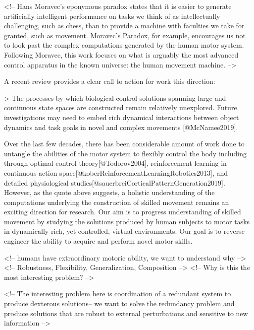 \documentclass[../main.tex]{subfiles}
\begin{document}
<!-- Hans Moravec's eponymous paradox states that it is easier to generate artificially intelligent performance on tasks we think of as intellectually challenging, such as chess, than to provide a machine with faculties we take for granted, such as movement. Moravec's Paradox, for example, encourages us not to look past the complex computations generated by the human motor system. Following Moravec, this work focuses on what is arguably the most advanced control apparatus in the known universe: the human movement machine. -->


A recent review provides a clear call to action for work this direction:

> The processes by which biological control solutions spanning large and continuous state spaces are constructed remain relatively unexplored. Future investigations may need to embed rich dynamical interactions between object dynamics and task goals in novel and complex movements [@McNamee2019].

Over the last few decades, there has been considerable amount of work done to untangle the abilities of the motor system to flexibly control the body including through optimal control theory[@Todorov2004], reinforcement learning in continuous action space[@koberReinforcementLearningRobotics2013], and detailed physiological studies[@sauerbreiCorticalPatternGeneration2019]. However, as the quote above suggests, a holistic understanding of the computations underlying the construction of skilled movement remains an exciting direction for research. Our aim is to progress understanding of skilled movement by studying the solutions produced by human subjects to motor tasks in dynamically rich, yet controlled, virtual environments. Our goal is to reverse-engineer the ability to acquire and perform novel motor skills.

<!-- humans have extraordinary motoric ability, we want to understand why -->
<!-- Robustness, Flexibility, Generalization, Composition -->
<!-- Why is this the most interesting problem?  -->

<!-- The interesting problem here is coordination of a redundant system to produce dexterous solutions-- we want to solve the redundancy problem and produce solutions that are robust to external perturbations and sensitive to new information -->
\end{document}
